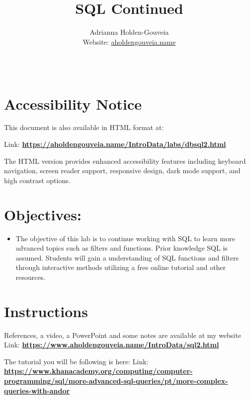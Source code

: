 \documentclass[12pt]{article}
\title{SQL Continued}
\author{
        Adrianna Holden-Gouveia \\
        Website: \href{https://aholdengouveia.name}{aholdengouveia.name}\\ 
        \date{\vspace{-5ex}}
        \faGithub {: aholdengouveia} \\
        }
\begin{document}
    

\maketitle



\section*{Accessibility Notice}
This document is also available in HTML format at:

Link: \href{https://aholdengouveia.name/IntroData/labs/dbsql2.html}{\textbf{https://aholdengouveia.name/IntroData/labs/dbsql2.html}}

The HTML version provides enhanced accessibility features including keyboard navigation, screen reader support, responsive design, dark mode support, and high contrast options.

\section*{Objectives:}
\begin{itemize}
    \item The objective of this lab is to continue working with SQL to learn more advanced topics such as filters and functions. Prior knowledge SQL is assumed. Students will gain a understanding of SQL functions and filters through interactive methods utilizing a free online tutorial and other resources.
\end{itemize}
\section*{Instructions}

References, a video, a PowerPoint and some notes are available at my website
Link: \href{https://www.aholdengouveia.name/IntroData/sql2.html}{\textbf{https://www.aholdengouveia.name/IntroData/sql2.html}}

The tutorial you will be following is here: Link: \href{https://www.khanacademy.org/computing/computer-programming/sql/more-advanced-sql-queries/pt/more-complex-queries-with-andor}{\textbf{https://www.khanacademy.org/computing/computer-programming/sql/more-advanced-sql-queries/pt/more-complex-queries-with-andor}} 
\end{document}
